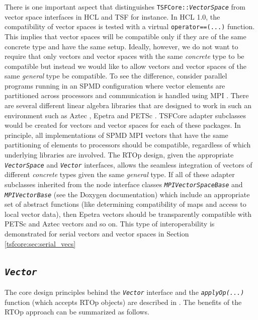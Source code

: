 There is one important aspect that distinguishes
{}\texttt{TSFCore\-::\textit{VectorSpace}} from vector space
interfaces in HCL and TSF for instance.  In HCL 1.0, the compatibility
of vector spaces is tested with a virtual {}\texttt{operator==(...)}
function.  This implies that vector spaces will be compatible only if
they are of the same concrete type and have the same setup.  Ideally,
however, we do not want to require that only vectors and vector spaces
with the same {\em concrete} type to be compatible but instead we
would like to allow vectors and vector spaces of the same {\em
general} type be compatible.  To see the difference, consider parallel
programs running in an SPMD configuration where vector elements are
partitioned across processors and communication is handled using MPI
{}\cite{ref:mpi}.  There are several different linear algebra
libraries that are designed to work in such an environment such as
Aztec {}\cite{sd:aztec}, Epetra {}\cite{ref:Epetra} and PETSc
{}\cite{ref:petsc}.  TSFCore adapter subclasses would be created for
vectors and vector spaces for each of these packages.  In principle,
all implementations of SPMD MPI vectors that have the same
partitioning of elements to processors should be compatible,
regardless of which underlying libraries are involved.  The RTOp
design, given the appropriate {}\texttt{\textit{VectorSpace}} and
{}\texttt{\textit{Vector}} interfaces, allows the seamless integration
of vectors of different {\em concrete} types given the same {\em
general} type.  If all of these adapter subclasses inherited from the
node interface classes {}\texttt{\textit{MPIVectorSpaceBase}} and
{}\texttt{\textit{MPIVectorBase}} (see the Doxygen documentation)
which include an appropriate set of abstract functions (like determining
compatibility of maps and access to local vector data), then Epetra
vectors should be transparently compatible with PETSc and Aztec
vectors and so on.  This type of interoperability is demonstrated for
serial vectors and vector spaces in Section
{}\ref{tsfcore:sec:serial_vecs}

%
\subsection{\texttt{\textit{Vector}}}
\label{tsfcore:sec:vector}
%

The core design principles behind the {}\texttt{\textit{Vector}}
interface and the {}\texttt{\textit{applyOp(\-...)}} function (which
accepts RTOp objects) are described in {}\cite{ref:rtop_toms}.  The
benefits of the RTOp approach can be summarized as follows.

